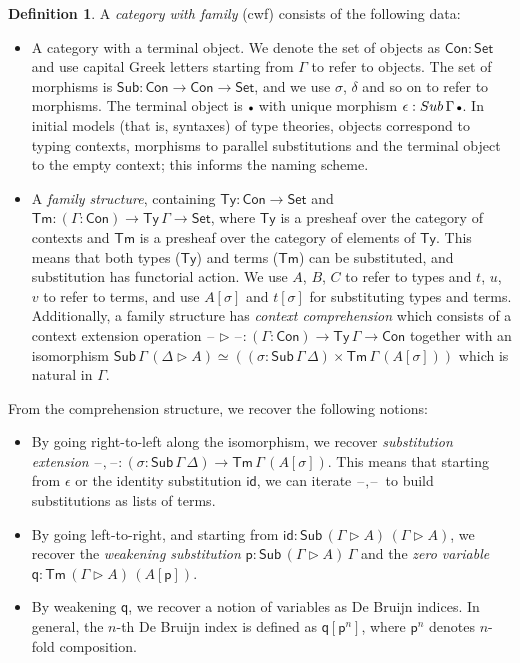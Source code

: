 \documentclass[a4paper,UKenglish,cleveref, autoref, thm-restate]{lipics-v2021}
\theoremstyle{remark}
\theoremstyle{definition}
\newtheorem{mydefinition}{Definition}
\newcommand{\Seti}{\mathsf{Set}}
\newcommand{\Con}{\mathsf{Con}}
\newcommand{\Ty}{\mathsf{Ty}}
\newcommand{\Tm}{\mathsf{Tm}}
\newcommand{\Sub}{\mathsf{Sub}}
\newcommand{\emptycon}{\scaleobj{.75}\bullet}
\newcommand{\id}{\mathsf{id}}
\newcommand{\ext}{\triangleright}
\newcommand{\blank}{\mathord{\hspace{1pt}\text{--}\hspace{1pt}}}
\newcommand{\p}{\mathsf{p}}
\newcommand{\q}{\mathsf{q}}
\begin{document}
\begin{mydefinition}
A \emph{category with family} (cwf) \cite{Dybjer96internaltype} consists of the following data:
\begin{itemize}
\item A category with a terminal object. We denote the set of objects as $\Con :
  \Seti$ and use capital Greek letters starting from $\Gamma$ to refer to
  objects. The set of morphisms is $\Sub : \Con \to \Con \to \Seti$, and we use
  $\sigma$, $\delta$ and so on to refer to morphisms. The terminal object is
  $\emptycon$ with unique morphism $\epsilon : \Sub\,\Gamma\,\emptycon$. In
  initial models (that is, syntaxes) of type theories, objects correspond to
  typing contexts, morphisms to parallel substitutions and the terminal object to
  the empty context; this informs the naming scheme.
\item A \emph{family structure}, containing $\Ty : \Con \to \Seti$ and $\Tm :
  (\Gamma : \Con) \to \Ty\,\Gamma \to \Seti$, where $\Ty$ is a presheaf over the
  category of contexts and $\Tm$ is a presheaf over the category of elements of
  $\Ty$. This means that both types ($\Ty$) and terms ($\Tm$) can be
  substituted, and substitution has functorial action. We use $A$, $B$, $C$ to
  refer to types and $t$, $u$, $v$ to refer to terms, and use $A[\sigma]$ and
  $t[\sigma]$ for substituting types and terms. Additionally, a family structure
  has \emph{context comprehension} which consists of a context extension
  operation $\blank\ext\blank : (\Gamma : \Con) \to \Ty\,\Gamma \to \Con$
  together with an isomorphism $\Sub\,\Gamma\,(\Delta\ext A) \simeq ((\sigma :
  \Sub\,\Gamma\,\Delta) \times \Tm\,\Gamma\,(A[\sigma]))$ which is natural in
  $\Gamma$.
\end{itemize}
\end{mydefinition}

\noindent From the comprehension structure, we recover the following notions:

\begin{itemize}
\item By going right-to-left along the isomorphism, we recover \emph{substitution extension}
      $\blank,\blank : (\sigma : \Sub\,\Gamma\,\Delta) \to \Tm\,\Gamma\,(A[\sigma])$. This means
      that starting from $\epsilon$ or the identity substitution $\id$, we can iterate $\blank,\blank$
      to build substitutions as lists of terms.
\item By going left-to-right, and starting from $\id : \Sub\,(\Gamma\ext A)\,(\Gamma\ext A)$, we recover
      the \emph{weakening substitution} $\p : \Sub\,(\Gamma\ext A)\,\Gamma$ and the \emph{zero variable}
      $\q : \Tm\,(\Gamma\ext A)\,(A[\p])$.
\item By weakening $\q$, we recover a notion of variables as De Bruijn indices. In general, the $n$-th
      De Bruijn index is defined as $\q[\p^{n}]$, where $\p^{n}$ denotes $n$-fold composition.
\end{itemize}
\end{document}
